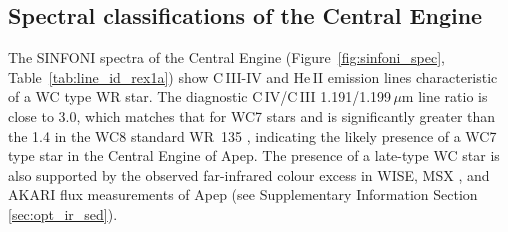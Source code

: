 \documentclass[preprint,times]{aastex61}
\begin{document}
\subsection{Spectral classifications of the Central Engine}
\label{sec:ir_spec_cent}

The SINFONI spectra of the Central Engine (Figure~\ref{fig:sinfoni_spec}, Table~\ref{tab:line_id_rex1a}) show C\,III-IV and He\,II emission lines characteristic of a WC type WR star. The diagnostic C\,IV/C\,III 1.191/1.199\,$\mu$m line ratio is close to 3.0, which matches that for WC7 stars \citep{2018MNRAS.473.2853R} and is significantly greater than the 1.4 in the WC8 standard WR~135 \citep{1991MNRAS.252..300E}, indicating the likely presence of a WC7 type star in the Central Engine of Apep. The presence of a late-type WC star is also supported by the observed far-infrared colour excess in WISE, MSX \citep{Egan1996}, and AKARI \citep{AKARI_IRC,AKARI_FIS} flux measurements of Apep (see Supplementary Information Section\,\ref{sec:opt_ir_sed}).
\end{document}
